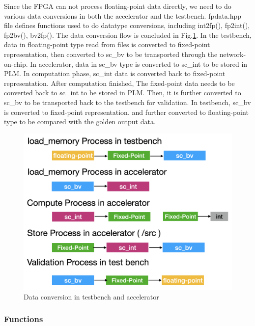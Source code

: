 Since the FPGA can not process floating-point data directly, we need to do
various data conversions in both the accelerator and the testbench. fpdata.hpp
file defines functions used to do datatype conversions, including int2fp(),
fp2int(), fp2bv(), bv2fp(). The data conversion flow is concluded in
Fig.\ref{fig-data-convert}. In the testbench, data in floating-point type read
from files is converted to fixed-point representation, then converted to sc\_bv
to be transported through the network-on-chip. In accelerator, data in sc\_bv
type is converted to sc\_int to be stored in PLM. In computation phase, sc\_int
data is converted back to fixed-point representation. After computation
finished, The fixed-point data needs to be converted back to sc\_int to be
stored in PLM. Then, it is further converted to sc\_bv to be transported back to
the testbench for validation. In testbench, sc\_bv is converted to fixed-point
representation. and further converted to floating-point type to be compared with
the golden output data. \\

\begin{figure}[t]
\centering
\captionsetup{justification=centering, format=hang}
\includegraphics[width=0.85\columnwidth]{figure/data-conversion.png}
\caption{Data conversion in testbench and accelerator}
\label{fig-data-convert}
\end{figure}



\subsubsection{Functions}

